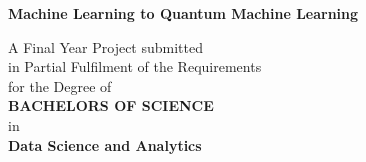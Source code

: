 \begin{titlepage}
\enlargethispage{3cm}

\begin{center}

\vspace*{-1cm}

\textbf{\Large Machine Learning to Quantum Machine Learning}\\[10pt]

\vspace*{0.5cm}


A Final Year Project submitted \\
in Partial Fulfilment of the Requirements  \\
for the Degree of  \\
\vspace{5mm}
{\Large \bf BACHELORS OF SCIENCE } \\
in \\
{\large \bf Data Science and Analytics } \\




\end{center}
\end{titlepage}
